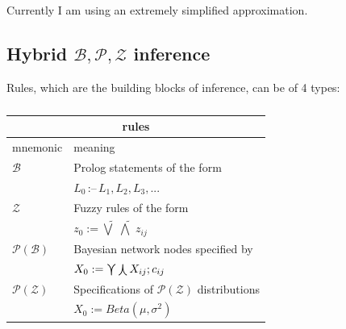 \documentclass[a4paper]{report}
\begin{document}
Currently I am using an extremely simplified approximation.






\subsection{Hybrid $\mathcal{B,P,Z}$ inference}

Rules, which are the building blocks of inference, can be of 4 types:

\begin{table}[H]
\parbox{3cm}{\caption{}}
\begin{tabular}{|l|l|} \hline
\multicolumn{2}{|c|}{\textbf{rules}}\\ \hline
mnemonic                   & meaning\\ \hline
$\mathcal{B}$              & Prolog statements of the form\\
                           & \qquad $L_0 \, \mbox{:--} \, L_1, L_2, L_3, ... $ \\
$\mathcal{Z}$              & Fuzzy rules of the form\\
                           & \qquad $z_0 := \widetilde{\bigvee} \; \widetilde{\bigwedge} \; z_{ij}$ \\
$\mathcal{P(B)}$           & Bayesian network nodes specified by\\
                           & \qquad $X_0 := \bigcurlyvee \bigcurlywedge X_{ij};c_{ij}$ \\
$\mathcal{P(Z)}$           & Specifications of $\mathcal{P(Z)}$ distributions\\
                           & \qquad $X_0 := Beta(\mu,\sigma^2)$ \\
\hline
\end{tabular}
\end{table}
\end{document}
